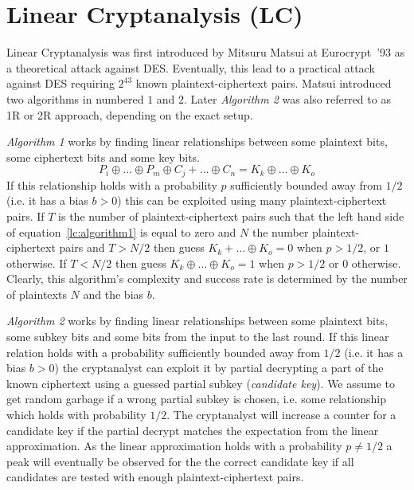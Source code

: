 \section{Linear Cryptanalysis (LC)}
Linear Cryptanalysis was first introduced by Mitsuru Matsui at Eurocrypt~'93 \cite{Matsui1993} as a theoretical attack against DES. Eventually, this lead to a practical attack against DES requiring $2^{43}$ known plaintext-ciphertext pairs. Matsui introduced two algorithms in \cite{Matsui1993} numbered $1$ and $2$. Later \emph{Algorithm 2} was also referred to as 1R or 2R approach, depending on the exact setup.

\emph{Algorithm 1} works by finding linear relationships between some plaintext bits, some ciphertext
bits and some key bits.
\begin{equation}
\label{lc:algorithm1}
P_i \oplus \dots \oplus P_m \oplus C_j + \dots \oplus C_n = K_k \oplus \dots \oplus K_o
\end{equation}
If this relationship holds with a probability $p$ sufficiently bounded away from $1/2$ (i.e. it has a bias $b > 0$) this can be exploited using many plaintext-ciphertext pairs. If $T$ is the number of plaintext-ciphertext pairs such that the left hand side of equation~\ref{lc:algorithm1} is equal to zero and $N$ the number plaintext-ciphertext pairs and $T>N/2$ then guess $K_k + \dots \oplus K_o = 0$ when $p > 1/2$, or $1$ otherwise. If $T < N/2$ then guess $K_k \oplus \dots \oplus K_o = 1$ when $p > 1/2$ or $0$ otherwise. Clearly, this algorithm's complexity and success rate is determined by the number of plaintexts $N$ and the bias $b$.

\emph{Algorithm 2} works by finding linear relationships between some plaintext bits, some subkey bits and some bits from the input to the last round. If this linear relation holds with a probability sufficiently bounded away from $1/2$ (i.e. it has a bias $b > 0$) the cryptanalyst can exploit it by partial decrypting a part of the known ciphertext using a guessed partial subkey (\emph{candidate key}). We assume to get random garbage if a wrong partial subkey is chosen, i.e. some relationship which holds with probability $1/2$. The cryptanalyst will increase a counter for a candidate key if the partial decrypt matches the expectation from the linear approximation. As the linear approximation holds with a probability $p \neq 1/2$ a peak will eventually be observed for the the correct candidate key if all candidates are tested with enough plaintext-ciphertext pairs.

